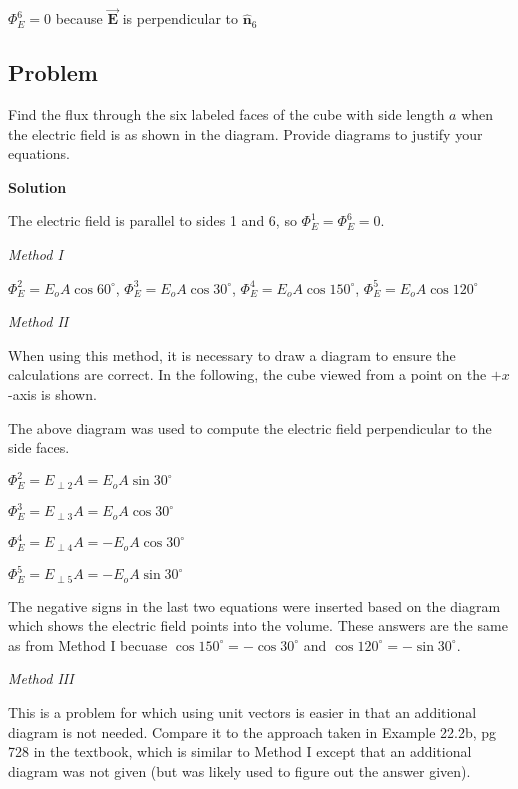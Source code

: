 \documentclass{article}
\newcommand{\bfvec}[1]{\vec{\mathbf{#1}}}
\begin{document}
$\Phi_E^6=0$ because $\bfvec{E}$ is perpendicular to $\hat{\mathbf{n}}_6$
\else

\newpage
\fi
\ifsolutions\else
\newpage
\fi

\subsection{Problem}



Find the flux through the six labeled faces of the cube with side length $a$ when the electric field is as shown in the diagram. Provide diagrams to justify your equations.

\ifsolutions
\textbf{Solution}

The electric field is parallel to sides 1 and 6, so $\Phi_E^1=\Phi_E^6=0$.

\emph{Method I}



$\Phi_E^2=E_oA\cos 60^\circ$, $\Phi_E^3=E_oA\cos 30^\circ$, $\Phi_E^4=E_oA\cos 150^\circ$, $\Phi_E^5=E_oA\cos 120^\circ$

\emph{Method II}

When using this method, it is necessary to draw a diagram to ensure the calculations are correct. In the following, the cube viewed from a point on the $+x$-axis is shown.



The above diagram was used to compute the electric field perpendicular to the side faces.

$\Phi_E^2=E_{\perp 2}A=E_oA\sin 30^\circ$

$\Phi_E^3=E_{\perp 3}A=E_oA\cos 30^\circ$

$\Phi_E^4=E_{\perp 4}A=-E_oA\cos 30^\circ$

$\Phi_E^5=E_{\perp 5}A=-E_oA\sin 30^\circ$

The negative signs in the last two equations were inserted based on the diagram which shows the electric field points into the volume. These answers are the same as from Method I becuase $\cos 150^\circ = -\cos 30^\circ$ and $\cos 120^\circ = -\sin 30^\circ$.

\emph{Method III}

This is a problem for which using unit vectors is easier in that an additional diagram is not needed. Compare it to the approach taken in Example 22.2b, pg 728 in the textbook, which is similar to Method I except that an additional diagram was not given (but was likely used to figure out the answer given).
\end{document}

